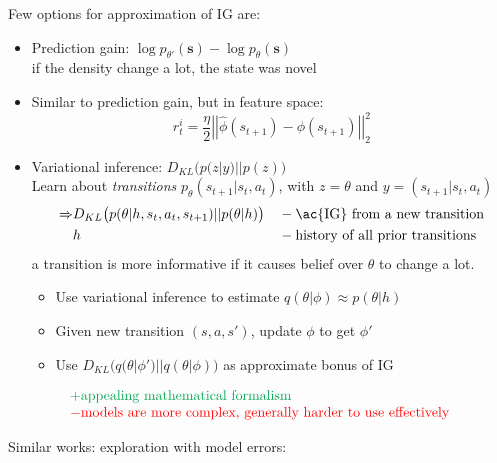 Few options for approximation of \ac{IG} are:
\begin{itemize}
	\item Prediction gain: $\log p_{\theta'}(\textbf{s}) - \log p_{\theta}(\textbf{s})$ \cite{bellemare2016unifying}\\
	 if the density change a lot, the state was novel
	\item Similar to prediction gain, but in feature space: \cite{pathak2017curiosity, burda2018large}
	\begin{equation}
		r^i_t = \frac{\eta}{2} \left|\left| \hat{\phi}(s_{t+1}) - \phi(s_{t+1}) \right|\right|^2_2
	\end{equation}
	\item Variational inference: $D_{KL} \big( p(z|y) || p(z) \big)$\\
	Learn about \textit{transitions} $p_\theta (s_{t+1}|s_t, a_t)$, with $z=\theta$ and $y=(s_{t+1}|s_t, a_t)$
	\begin{align}
		\Rightarrow&D_{KL} \big( p(\theta|h, s_t, a_t, s_{t+1}) || p(\theta|h) \big) && -\text{\ac{IG} from a new transition}\\
		&h && -\text{history of all prior transitions}
	\end{align}
	 a transition is more informative if it causes belief over $\theta$ to change a lot.\\
	 \cite{houthooft2016vime}
	\begin{itemize}
		\item Use variational inference to estimate $q(\theta|\phi) \approx p(\theta|h)$
		\item Given new transition $(s,a,s')$, update $\phi$ to get $\phi'$
		\item Use $D_{KL} \big( q(\theta|\phi') || q(\theta|\phi)\big)$ as approximate bonus of \ac{IG}
	\end{itemize}
\end{itemize}
\[\begin{matrix*}[l]
	\color{Green}+ \text{appealing mathematical formalism}\\
	\color{red}- \text{models are more complex, generally harder to use effectively}
\end{matrix*}\]

Similar works: exploration with model errors: \cite{schmidhuber2010formal, stadie2015incentivizing}

